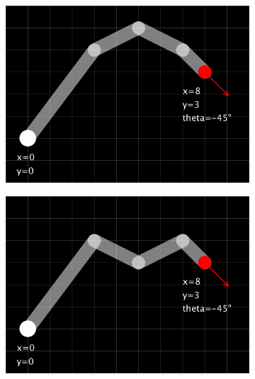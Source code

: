 \begin{figure}[h]
    \centering
    \begin{subfigure}[b]{0.32\textwidth}
        \includegraphics[width=\textwidth]{figures/ik-multi-1.png}
    \end{subfigure}
    \hfill
    \begin{subfigure}[b]{0.32\textwidth}
        \includegraphics[width=\textwidth]{figures/ik-multi-2.png}
    \end{subfigure}
    \hfill
    \begin{subfigure}[b]{0.32\textwidth}

\end{subfigure}
\end{figure}
